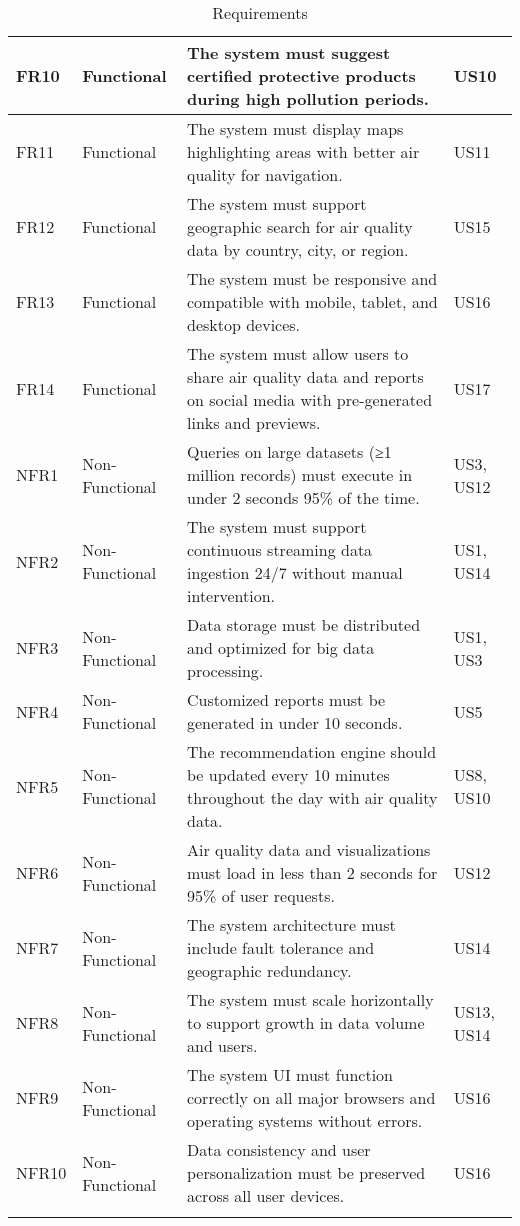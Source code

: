 \begin{longtable}{|p{2cm}|p{2cm}|p{8cm}|p{3cm}|}
FR10 & Functional & The system must suggest certified protective products during high pollution periods. & US10 \\ 
\hline

FR11 & Functional & The system must display maps highlighting areas with better air quality for navigation. & US11 \\ 
\hline

FR12 & Functional & The system must support geographic search for air quality data by country, city, or region. & US15 \\ 
\hline

FR13 & Functional & The system must be responsive and compatible with mobile, tablet, and desktop devices. & US16 \\ 
\hline

FR14 & Functional & The system must allow users to share air quality data and reports on social media with pre-generated links and previews. & US17 \\ 
\hline

NFR1 & Non-Functional & Queries on large datasets (≥1 million records) must execute in under 2 seconds 95\% of the time. & US3, US12 \\ 
\hline

NFR2 & Non-Functional & The system must support continuous streaming data ingestion 24/7 without manual intervention. & US1, US14 \\ 
\hline

NFR3 & Non-Functional & Data storage must be distributed and optimized for big data processing. & US1, US3 \\ 
\hline

NFR4 & Non-Functional & Customized reports must be generated in under 10 seconds. & US5 \\ 
\hline

NFR5 & Non-Functional & The recommendation engine should be updated every 10 minutes throughout the day with air quality data. & US8, US10 \\ 
\hline

NFR6 & Non-Functional & Air quality data and visualizations must load in less than 2 seconds for 95\% of user requests. & US12 \\ 
\hline

NFR7 & Non-Functional & The system architecture must include fault tolerance and geographic redundancy. & US14 \\ 
\hline

NFR8 & Non-Functional & The system must scale horizontally to support growth in data volume and users. & US13, US14 \\ 
\hline

NFR9 & Non-Functional & The system UI must function correctly on all major browsers and operating systems without errors. & US16 \\ 
\hline

NFR10 & Non-Functional & Data consistency and user personalization must be preserved across all user devices. & US16 \\ 
\hline

\caption{Requirements}
\end{longtable}

